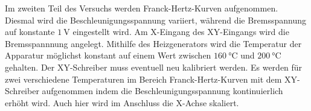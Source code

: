 Im zweiten Teil des Versuchs werden Franck-Hertz-Kurven aufgenommen. 
Diesmal wird die Beschleunigungsspannung variiert, während die Bremsspannung auf konstante $\qty{1}{\volt}$ eingestellt wird.
Am X-Eingang des XY-Eingangs wird die Bremsspannnung angelegt.
Mithilfe des Heizgenerators wird die Temperatur der Apparatur möglichst konstant auf einem Wert zwischen $\qty{160}{\celsius}$
und $\qty{200}{\celsius}$ gehalten.
Der XY-Schreiber muss eventuell neu kalibriert werden. 
Es werden für zwei verschiedene Temperaturen im Bereich Franck-Hertz-Kurven mit dem XY-Schreiber aufgenommen indem die Beschleunigungsspannung
kontinuierlich erhöht wird.
Auch hier wird im Anschluss die X-Achse skaliert.\\



